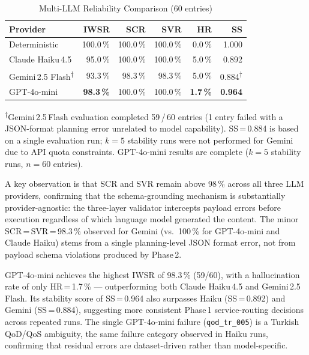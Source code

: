 \documentclass[conference]{IEEEtran}
\begin{document}
\begin{table}[t]
\centering
\caption{Multi-LLM Reliability Comparison (60 entries)}
\label{tab:multilm}
\small
\begin{tabular}{lrrrrr}
\toprule
\textbf{Provider} & \textbf{IWSR} & \textbf{SCR} & \textbf{SVR} & \textbf{HR} & \textbf{SS} \\
\midrule
Deterministic     & 100.0\,\% & 100.0\,\% & 100.0\,\% & 0.0\,\% & 1.000 \\
Claude Haiku\,4.5 &  95.0\,\% & 100.0\,\% & 100.0\,\% & 5.0\,\% & 0.892 \\
Gemini\,2.5 Flash\textsuperscript{$\dagger$} &  93.3\,\% &  98.3\,\% &  98.3\,\% & 5.0\,\% & 0.884\textsuperscript{$\dagger$} \\
GPT-4o-mini       &  \textbf{98.3\,\%} & 100.0\,\% & 100.0\,\% & \textbf{1.7\,\%} & \textbf{0.964} \\
\bottomrule
\end{tabular}
\vspace{2pt}

\noindent\footnotesize
\textsuperscript{$\dagger$}Gemini\,2.5\,Flash evaluation completed 59\,/\,60 entries
(1 entry failed with a JSON-format planning error unrelated to model capability).
SS\,=\,0.884 is based on a single evaluation run; $k=5$ stability runs were not performed
for Gemini due to API quota constraints.
GPT-4o-mini results are complete ($k=5$ stability runs, $n=60$ entries).
\end{table}

A key observation is that SCR and SVR remain above 98\,\% across all three
LLM providers, confirming that the schema-grounding mechanism is
substantially provider-agnostic: the three-layer validator intercepts
payload errors before execution regardless of which language model
generated the content.
The minor SCR\,=\,SVR\,=\,98.3\,\% observed for Gemini (vs.\ 100\,\% for
GPT-4o-mini and Claude Haiku) stems from a single planning-level JSON
format error, not from payload schema violations produced by Phase\,2.

GPT-4o-mini achieves the highest IWSR of 98.3\,\% (59/60), with a
hallucination rate of only HR\,=\,1.7\,\% --- outperforming both Claude
Haiku\,4.5 and Gemini\,2.5\,Flash.
Its stability score of SS\,=\,0.964 also surpasses Haiku (SS\,=\,0.892)
and Gemini (SS\,=\,0.884), suggesting more consistent Phase\,1
service-routing decisions across repeated runs.
The single GPT-4o-mini failure (\texttt{qod\_tr\_005}) is a Turkish
QoD/QoS ambiguity, the same failure category observed in Haiku runs,
confirming that residual errors are dataset-driven rather than
model-specific.
\end{document}
